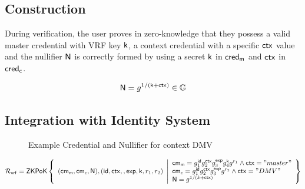 \subsection{Construction}
During verification, the user proves in zero-knowledge that they possess a valid master credential with VRF key $\mathsf{k}$, a context credential with a specific $\mathsf{ctx}$ value and the nullifier $\mathsf{N}$ is correctly formed by using a secret $\mathsf{k}$ in $\mathsf{cred_m}$ and $\mathsf{ctx}$ in $\mathsf{cred_c}$. 

\begin{equation}
\mathsf{N} = g^{1/(\mathsf{k} + \mathsf{ctx})} \in \mathbb{G}
\end{equation}

\subsection{Integration with Identity System}


\begin{figure}
        \begin{pchstack}[boxed, center, space=4em]
            \begin{pcvstack}
            \end{pcvstack}
            \pcvspace
            \begin{pcvstack}
            \end{pcvstack}
            \begin{pcvstack}
            \end{pcvstack}
        \end{pchstack}
    \caption{Example Credential and Nullifier for context DMV}
    \label{fig:two-creds}
\end{figure}


\[
    \mathcal{R}_{\mathsf{vrf}} = {\mathsf{ZKPoK}} \left\{ 
    \begin{array}{l} 
    (\mathsf{cm_m}, \mathsf{cm_c}, \mathsf{N}), (\mathsf{id}, \mathsf{ctx}, , \mathsf{exp}, \mathsf{k}, r_1, r_2) \\
    \end{array} 
    \middle|
    \begin{array}{l}
        \mathsf{cm_m} = g_1^{\mathsf{id}}g_2^{\mathsf{ctx}}g_3^{\mathsf{exp}}g_4^{\mathsf{k}}g^{r_1}  \wedge \mathsf{ctx}="master" \\
        \mathsf{cm_c} = g_1^{\mathsf{id}}g_2^{\mathsf{ctx}}g_3^{\mathsf{exp}}g^{r_2} \wedge \mathsf{ctx}="DMV" \\
        \mathsf{N} = g^{1/(k + \mathsf{ctx})}
    \end{array} 
    \right\}
\]
    

